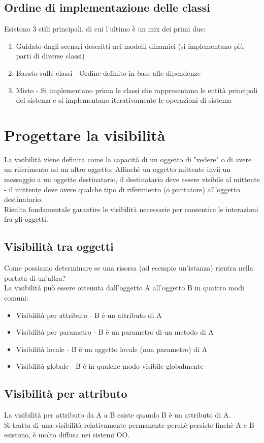 \subsection{Ordine di implementazione delle classi}
Esistono 3 stili principali, di cui l'ultimo è un mix dei primi due:
\begin{enumerate}
    \item Guidato dagli scenari descritti nei modelli dinamici (si implementano più parti di diverse
    classi)
    \item Basato sulle classi - Ordine definito in base alle dipendenze
    \item Misto - Si implementano prima le classi che rappresentano le entità
    principali del sistema e si implementano iterativamente le operazioni di sistema
\end{enumerate}
\section{Progettare la visibilità}
La visibilità viene definita come la capacità di un oggetto di "vedere" o di avere un
riferimento ad un altro oggetto. Affinchè un oggetto mittente invii un messaggio a un oggetto
destinatario, il destinatario deve essere visibile al mittente - il mittente
deve avere qualche tipo di riferimento (o puntatore) all'oggetto destinatario.\\
Risulta fondamentale garantire le visibilità necessarie per consentire le interazioni fra gli oggetti.
\subsection{Visibilità tra oggetti}
Come possiamo determinare se una risorsa (ad esempio un'istanza) rientra nella portata
di un'altra?\\
La visibilità può essere ottenuta dall'oggetto A all'oggetto B in quattro modi comuni:
\begin{itemize}
    \item Visibilità per attributo - B è un attributo di A
    \item Visibilità per parametro - B è un parametro di un metodo di A
    \item Visibilità locale - B è un oggetto locale (non parametro) di A
    \item Visibilità globale - B è in qualche modo visibile globalmente
\end{itemize}
\subsection{Visibilità per attributo}
La visibilità per attributo da A a B esiste quando B è un attributo di A.\\
Si tratta di una visibilità relativamente permanente perchè persiste finchè A e B esistono,
è molto diffusa nei sistemi OO.
